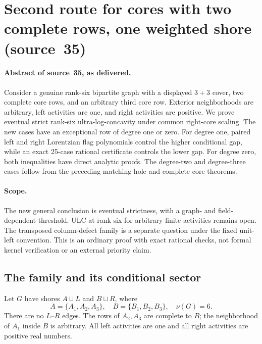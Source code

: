 \documentclass[11pt,a4paper]{article}
\theoremstyle{remark}\newtheorem{remark}[theorem]{Remark}
\begin{document}
\section{Second route for cores with two complete rows, one weighted shore (source~35)}\label{mrn:src:35}
\paragraph{Abstract of source~35, as delivered.} Consider a genuine rank-six bipartite graph with a displayed $3+3$ cover, two complete core rows, and an arbitrary third core row. Exterior neighborhoods are arbitrary, left activities are one, and right activities are positive. We prove eventual strict rank-six ultra-log-concavity under common right-core scaling. The new cases have an exceptional row of degree one or zero. For degree one, paired left and right Lorentzian flag polynomials control the higher conditional gap, while an exact 25-case rational certificate controls the lower gap. For degree zero, both inequalities have direct analytic proofs. The degree-two and degree-three cases follow from the preceding matching-hole and complete-core theorems.

\paragraph{Scope.}
The new general conclusion is eventual strictness, with a graph- and field-dependent threshold. ULC at rank six for arbitrary finite activities remains open. The transposed column-defect family is a separate question under the fixed unit-left convention. This is an ordinary proof with exact rational checks, not formal kernel verification or an external priority claim.

\subsection{The family and its conditional sector}
Let $G$ have shores $A\sqcup L$ and $B\sqcup R$, where
\[
 A=\{A_1,A_2,A_3\},\quad B=\{B_1,B_2,B_3\},\quad \nu(G)=6.
\]
There are no $L$--$R$ edges. The rows of $A_2,A_3$ are complete to $B$; the neighborhood of $A_1$ inside $B$ is arbitrary. All left activities are one and all right activities are positive real numbers.
\end{document}
